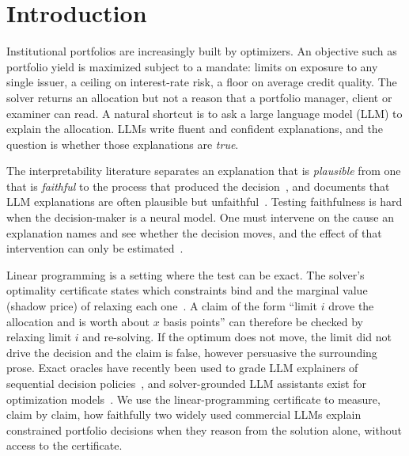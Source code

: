 \section{Introduction}
Institutional portfolios are increasingly built by optimizers. An objective
such as portfolio yield is maximized subject to a mandate: limits on exposure
to any single issuer, a ceiling on interest-rate risk, a floor on average
credit quality. The solver returns an allocation but not a reason that a
portfolio manager, client or examiner can read. A natural shortcut is to ask a
large language model (LLM) to explain the allocation. LLMs write fluent and
confident explanations, and the question is whether those explanations are
\emph{true}.

The interpretability literature separates an explanation that is
\emph{plausible} from one that is \emph{faithful} to the process that produced
the decision~\cite{jacovi20,lyu24}, and documents that LLM explanations are
often plausible but unfaithful~\cite{turpin23,matton25}. Testing faithfulness is
hard when the decision-maker is a neural model. One must intervene on the cause
an explanation names and see whether the decision moves, and the effect of
that intervention can only be estimated~\cite{atanasova23,zaman25}.

Linear programming is a setting where the test can be exact. The solver's
optimality certificate states which constraints bind and the marginal value
(shadow price) of relaxing each one~\cite{bertsimas97}. A claim of the form
``limit $i$ drove the allocation and is worth about $x$ basis points'' can
therefore be checked by relaxing limit $i$ and re-solving. If the optimum does
not move, the limit did not drive the decision and the claim is false, however
persuasive the surrounding prose. Exact oracles have recently been used to
grade LLM explainers of sequential decision policies~\cite{gross26}, and
solver-grounded LLM assistants exist for optimization
models~\cite{optiguide23,optichat25}. We use the linear-programming certificate
to measure, claim by claim, how faithfully two widely used commercial LLMs
explain constrained portfolio decisions when they reason from the solution
alone, without access to the certificate.

